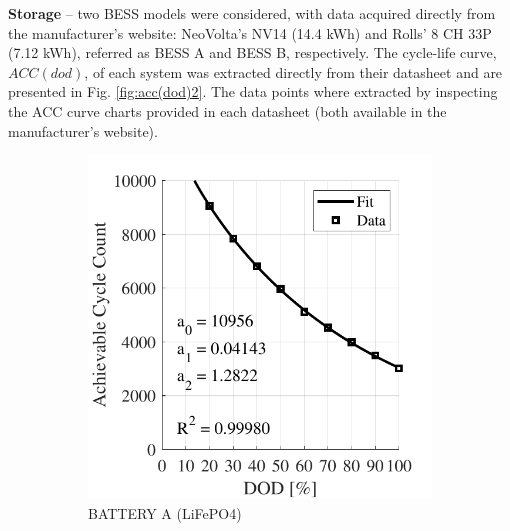 \documentclass{ieeeaccess}
\begin{document}
	\textbf{Storage} -- two \ac{BESS} models were considered, with data acquired directly from the manufacturer's website: NeoVolta's NV14 (14.4 kWh) and Rolls' 8 CH 33P (7.12 kWh), referred as \ac{BESS} A and \ac{BESS} B, respectively. The cycle-life curve, $ACC(dod)$, of each system was extracted directly from their datasheet and are presented in Fig. \ref{fig:acc(dod)2}. The data points where extracted by inspecting the \ac{ACC} curve charts provided in each datasheet (both available in the manufacturer's website).
	\begin{figure}[!h]
		\begin{subfigure}{.235\textwidth}
			\centering
			\includegraphics[width=\linewidth]{figures/acc_fitting_NeoVolta_NV24_LiFePO4.pdf}
			\caption{BATTERY A (LiFePO4)}
			\label{fig:accNeovolta2}
		\end{subfigure}
		\begin{subfigure}{.235\textwidth}
			\centering

\end{subfigure}
\end{figure}
\end{document}
